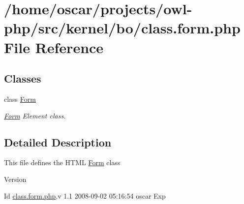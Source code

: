 \section{/home/oscar/projects/owl-\/php/src/kernel/bo/class.form.php File Reference}
\label{class_8form_8php}
\subsection*{Classes}
\begin{DoxyCompactItemize}
\item 
class \hyperlink{classForm}{Form}
\begin{DoxyCompactList}\small\item\em \hyperlink{classForm}{Form} Element class. \item\end{DoxyCompactList}\end{DoxyCompactItemize}


\subsection{Detailed Description}
This file defines the HTML \hyperlink{classForm}{Form} class \begin{DoxyVersion}{Version}

\end{DoxyVersion}
\begin{DoxyParagraph}{Id}
\hyperlink{class_8form_8php}{class.form.php},v 1.1 2008-\/09-\/02 05:16:54 oscar Exp 
\end{DoxyParagraph}
